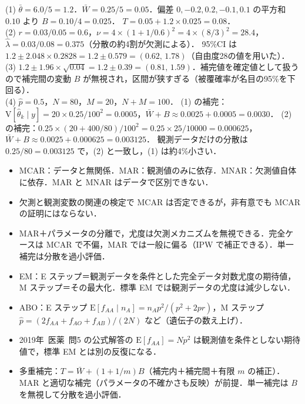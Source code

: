 \documentclass[a4paper,11pt,openany]{ltjsbook}
\newenvironment{kaitou}[1]{%
  \par\medskip\noindent
  \begin{tcolorbox}[enhanced,breakable,colback=bkgray!3,colframe=bkgray!60,boxrule=0.4pt,
    left=4pt,right=4pt,top=2pt,bottom=2pt,arc=1pt,
    title={\cref{#1}の解答},fonttitle=\bfseries\small,coltitle=white,colbacktitle=bkgray!80]}%
  {\end{tcolorbox}\par}
\newcommand{\kakomon}[2]{\mbox{#1年 医薬 問#2}}
\newcommand{\E}{\mathrm{E}}
\newcommand{\V}{\mathrm{V}}
\begin{document}
\begin{kaitou}{reidai:16-4}
(1) $\bar\theta=6.0/5=1.2$．$\bar W=0.25/5=0.05$．偏差 $0,-0.2,0.2,-0.1,0.1$ の平方和 $0.10$ より $B=0.10/4=0.025$．
$T=0.05+1.2\times0.025=0.08$．\\
(2) $r=0.03/0.05=0.6$，$\nu=4\times(1+1/0.6)^2=4\times(8/3)^2=28.4$，$\hat\lambda=0.03/0.08=0.375$（分散の約4割が欠測による）．
95\%CI は $1.2\pm2.048\times0.2828=1.2\pm0.579=(0.62,\,1.78)$（自由度28の値を用いた）．\\
(3) $1.2\pm1.96\times\sqrt{0.04}=1.2\pm0.39=(0.81,\,1.59)$．補完値を確定値として扱うので補完間の変動 $B$ が無視され，区間が狭すぎる（被覆確率が名目の95\%を下回る）．\\
(4) $\hat p=0.5$，$N=80$，$M=20$，$N+M=100$．
(1) の補完：$\V[\hat\theta_k\mid y]=20\times0.25/100^2=0.0005$，$\bar W+B\approx0.0025+0.0005=0.0030$．
(2) の補完：$0.25\times(20+400/80)/100^2=0.25\times25/10000=0.000625$，$\bar W+B\approx0.0025+0.000625=0.003125$．
観測データだけの分散は $0.25/80=0.003125$ で，(2) と一致し，(1) は約4\%小さい．
\end{kaitou}

\begin{summarybox}
\begin{itemize}
\item MCAR：データと無関係．MAR：観測値のみに依存．MNAR：欠測値自体に依存．MAR と MNAR はデータで区別できない．
\item 欠測と観測変数の関連の検定で MCAR は否定できるが，非有意でも MCAR の証明にはならない．
\item MAR＋パラメータの分離で，尤度は欠測メカニズムを無視できる．完全ケースは MCAR で不偏，MAR では一般に偏る（IPW で補正できる）．単一補完は分散を過小評価．
\item EM：E ステップ＝観測データを条件とした完全データ対数尤度の期待値，M ステップ＝その最大化．標準 EM では観測データの尤度は減少しない．
\item ABO：E ステップ $\E[f_{AA}\mid n_A]=n_Ap^2/(p^2+2pr)$，M ステップ $\hat p=(2f_{AA}+f_{AO}+f_{AB})/(2N)$ など（遺伝子の数え上げ）．
\item \kakomon{2019}{5} の公式解答の $\E[f_{AA}]=Np^2$ は観測値を条件としない期待値で，標準 EM とは別の反復になる．
\item 多重補完：$T=\bar W+(1+1/m)B$（補完内＋補完間＋有限 $m$ の補正）．MAR と適切な補完（パラメータの不確かさも反映）が前提．単一補完は $B$ を無視して分散を過小評価．
\end{itemize}
\end{summarybox}
\end{document}

